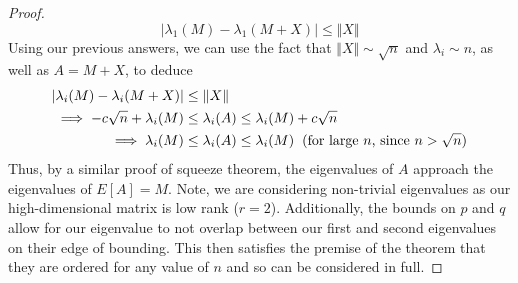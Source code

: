 \documentclass[11pt]{article}
\begin{document}
\begin{enumerate}
\begin{proof}
\begin{equation}
	\vert \lambda_1 (M) - \lambda_1 (M + X) \vert \le \Vert X \Vert
	\end{equation}
	Using our previous answers, we can use the fact that $\Vert X \Vert \sim \sqrt{n}$ and $\lambda_i \sim n$, as well as $A = M + X$, to deduce
	\begin{align*}
		\vert \lambda_i (M) - \lambda_i (M + X) \vert &\le \Vert X \Vert \\
		\implies -c\sqrt{n} + \lambda_i(M) &\le \lambda_i(A) \le \lambda_i(M) + c\sqrt{n} \\
		\implies \lambda_i(M) &\le \lambda_i(A) \le \lambda_i(M) \hspace{0.2cm}\text{(for large $n$, since $n > \sqrt{n}$)}
	\end{align*}
	Thus, by a similar proof of squeeze theorem, the eigenvalues of $A$ approach the eigenvalues of $E[A] = M$. Note, we are considering non-trivial eigenvalues
	as our high-dimensional matrix is low rank ($r = 2$). Additionally, the bounds on $p$ and $q$ allow for our eigenvalue to not overlap between our first and second eigenvalues on their edge of bounding.
	This then satisfies the premise of the theorem that they are ordered for any value of $n$ and so can be considered in full.
	\end{proof}
\end{enumerate}
\begin{center}
\end{center}
\end{document}
